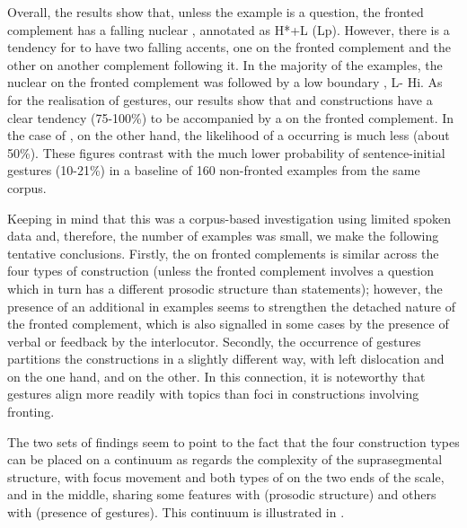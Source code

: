 \documentclass[output=paper]{LSP/langsci}
\begin{document}
\newpage 
Overall, the results show that, unless the example is a question, the
fronted complement has a falling nuclear , annotated as H*+L 
(Lp). However, there is a tendency for  to have
two falling  accents, one on the fronted complement and
the other on another complement following it. In the majority of the
examples, the nuclear  on the fronted complement was
followed by a low boundary , L- Hi. As for the
realisation of gestures, our results show that  and
 constructions have a clear tendency (75-100\%) to
be accompanied by a  on the fronted complement. In the
case of , on the other hand, the likelihood of a 
occurring is much less (about 50\%).
These figures contrast with the much lower probability of
sentence-initial gestures (10-21\%) in a baseline of 160 non-fronted
examples from the same corpus.

Keeping in mind that this was a corpus-based investigation using
limited spoken data and, therefore, the number of examples was small,
we make the following tentative conclusions. Firstly, the  on fronted
complements is similar across the four types of construction (unless
the fronted complement involves a question which in turn has a
different prosodic structure than statements); however, the presence
of an additional  in  examples seems to
strengthen the detached nature of the fronted complement, which is
also signalled in some cases by the presence of verbal or 
feedback by the interlocutor. Secondly, the occurrence of gestures
partitions the constructions in a slightly different way, with left
dislocation and  on the one hand, and  on
the other.
In this connection, it is noteworthy that gestures align
more readily with topics than foci in constructions involving
fronting.



The two sets of findings seem to point to the
fact that the four construction types can be placed on a continuum as
regards the complexity of the suprasegmental structure, with focus
movement and both types of  on the two ends of the
scale, and  in the middle, sharing some features with
 (prosodic structure) and others with 
(presence of gestures). This continuum is illustrated in
.
\end{document}
